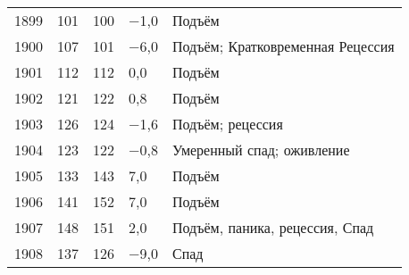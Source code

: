 \documentclass[leqno]{article}  %
\begin{document}
\begin{enumerate}[{(1)}]
\begin{table}
{\begin{tabular}{p{}|p{}|p{}|p{}|p{}}
\hline
1899 & \hfill 101 \hspace*{2.5mm} & \hfill 100 \hspace*{2.5mm} & \hfill \(-\)1,0 \hspace*{2.5mm} & Подъём\\
1900 & \hfill 107 \hspace*{2.5mm} & \hfill 101 \hspace*{2.5mm} & \hfill \(-\)6,0 \hspace*{2.5mm} & Подъём; Кратковременная Рецессия\\
1901 & \hfill 112 \hspace*{2.5mm} & \hfill 112 \hspace*{2.5mm} & \hfill 0,0 \hspace*{2.5mm} & Подъём\\
1902 & \hfill 121 \hspace*{2.5mm} & \hfill 122 \hspace*{2.5mm} & \hfill 0,8 \hspace*{2.5mm} & Подъём\\
1903 & \hfill 126 \hspace*{2.5mm} & \hfill 124 \hspace*{2.5mm} & \hfill \(-\)1,6 \hspace*{2.5mm} & Подъём; рецессия\\
1904 & \hfill 123 \hspace*{2.5mm} & \hfill 122 \hspace*{2.5mm} & \hfill \(-\)0,8 \hspace*{2.5mm} & Умеренный спад; оживление\\
1905 & \hfill 133 \hspace*{2.5mm} & \hfill 143 \hspace*{2.5mm} & \hfill 7,0 \hspace*{2.5mm} & Подъём\\
1906 & \hfill 141 \hspace*{2.5mm} & \hfill 152 \hspace*{2.5mm} & \hfill 7,0 \hspace*{2.5mm} & Подъём\\
1907 & \hfill 148 \hspace*{2.5mm} & \hfill 151 \hspace*{2.5mm} & \hfill 2,0 \hspace*{2.5mm} & Подъём, паника, рецессия, Спад\\
1908 & \hfill 137 \hspace*{2.5mm} & \hfill 126 \hspace*{2.5mm} & \hfill \(-\)9,0 \hspace*{2.5mm} & Спад\\

\end{tabular}}
\end{table}
\end{enumerate}
\end{document}
